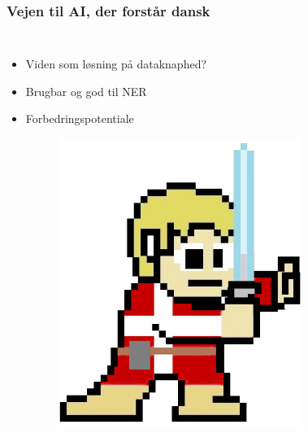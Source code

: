 \documentclass{beamer}
\begin{document}
\begin{frame}
    \frametitle{Vejen til AI, der forstår dansk}
    \begin{columns}
        \begin{itemize}
            \item Viden som løsning på dataknaphed?
            \item Brugbar og god til NER
            \item Forbedringspotentiale
        \begin{figure}[H]
            \centering
                \href{https://github.com/peleiden/daLUKE}{
                    \includegraphics[width=.7\linewidth]{daluke-mascot}
                }
        \end{figure}\noindent
        \end{itemize}
        \begin{figure}[H]
            \centering

\end{figure}
\end{columns}
\end{frame}
\end{document}
